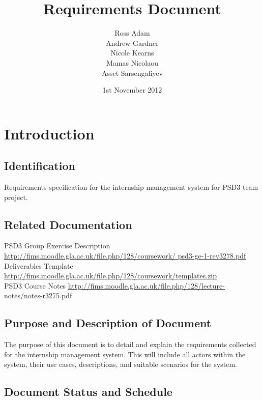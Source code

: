 \documentclass{l3deliverable}
\title{Requirements Document}
\author{Ross Adam\\
Andrew Gardner\\
Nicole Kearns\\
Mamas Nicolaou\\
Asset Sarsengaliyev\\
}
\date{1st November 2012}
\begin{document}
\maketitle
\tableofcontents
\newpage
\section{Introduction}

\subsection{Identification}

Requirements specification for the internship management system for PSD3 team project.
\subsection{Related Documentation}

PSD3 Group Exercise Description \url{http://fims.moodle.gla.ac.uk/file.php/128/coursework/
psd3-ge-1-rev3278.pdf}\\
Deliverables Template \url{http://fims.moodle.gla.ac.uk/file.php/128/coursework/templates.zip}\\
PSD3 Course Notes \url{http://fims.moodle.gla.ac.uk/file.php/128/lecture-notes/notes-r3275.pdf}
\\
\subsection{Purpose and Description of Document}

The purpose of this document is to detail and explain the requirements collected for the
internship management system. This will include all actors within the system, their use cases, descriptions, and suitable 
scenarios for the system.

\subsection{Document Status and Schedule}
\end{document}
